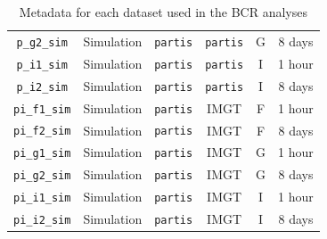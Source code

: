 \documentclass{article}
\newcommand{\partis}{\texttt{partis}}
\begin{document}
\begin{table}
{\begin{tabular}{c|c|c|c|c|c}
    \texttt{p\_g2\_sim} & Simulation & \partis & \partis & G & 8 days\\
    \texttt{p\_i1\_sim} & Simulation & \partis & \partis & I & 1 hour\\
    \texttt{p\_i2\_sim} & Simulation & \partis & \partis & I & 8 days\\
    \texttt{pi\_f1\_sim} & Simulation& \partis & IMGT & F & 1 hour\\
    \texttt{pi\_f2\_sim} & Simulation& \partis & IMGT & F & 8 days\\
    \texttt{pi\_g1\_sim} & Simulation& \partis & IMGT & G & 1 hour\\
    \texttt{pi\_g2\_sim} & Simulation& \partis & IMGT & G & 8 days\\
    \texttt{pi\_i1\_sim} & Simulation& \partis & IMGT & I & 1 hour\\
    \texttt{pi\_i2\_sim} & Simulation& \partis & IMGT & I & 8 days\\
\end{tabular}
}
\caption{Metadata for each dataset used in the BCR analyses}
\label{tab:Datasets}
\end{table}
\end{document}
